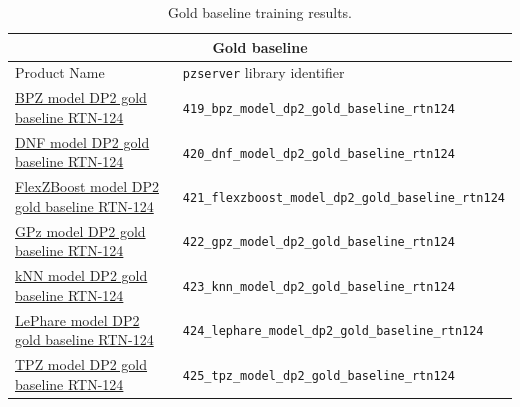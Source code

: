 \begin{table}
\centering
\begin{tabular}{ll}
\hline
\multicolumn{2}{c}{Gold baseline} \\ \hline
Product Name & \texttt{pzserver} library identifier \\
\hline
\hline
\href{https://pzserver.linea.org.br/product/419_bpz_model_dp2_gold_baseline_rtn124}
{BPZ model DP2 gold baseline RTN-124}
&
\texttt{419\_bpz\_model\_dp2\_gold\_baseline\_rtn124}
\\
\href{https://pzserver.linea.org.br/product/420_dnf_model_dp2_gold_baseline_rtn124}
{DNF model DP2 gold baseline RTN-124}
&
\texttt{420\_dnf\_model\_dp2\_gold\_baseline\_rtn124}
\\
\href{https://pzserver.linea.org.br/product/421_flexzboost_model_dp2_gold_baseline_rtn124}
{FlexZBoost model DP2 gold baseline RTN-124}
&
\texttt{421\_flexzboost\_model\_dp2\_gold\_baseline\_rtn124}
\\
\href{https://pzserver.linea.org.br/product/422_gpz_model_dp2_gold_baseline_rtn124}
{GPz model DP2 gold baseline RTN-124}
&
\texttt{422\_gpz\_model\_dp2\_gold\_baseline\_rtn124}
\\
\href{https://pzserver.linea.org.br/product/423_knn_model_dp2_gold_baseline_rtn124}
{kNN model DP2 gold baseline RTN-124}
&
\texttt{423\_knn\_model\_dp2\_gold\_baseline\_rtn124}
\\
\href{https://pzserver.linea.org.br/product/424_lephare_model_dp2_gold_baseline_rtn124}
{LePhare model DP2 gold baseline RTN-124}
&
\texttt{424\_lephare\_model\_dp2\_gold\_baseline\_rtn124}
\\
\href{https://pzserver.linea.org.br/product/425_tpz_model_dp2_gold_baseline_rtn124}
{TPZ model DP2 gold baseline RTN-124}
&
\texttt{425\_tpz\_model\_dp2\_gold\_baseline\_rtn124}
\\
\hline
\end{tabular}
\caption{Gold baseline training results.}
\label{tab:pzserver-gold-baseline}
\end{table}


